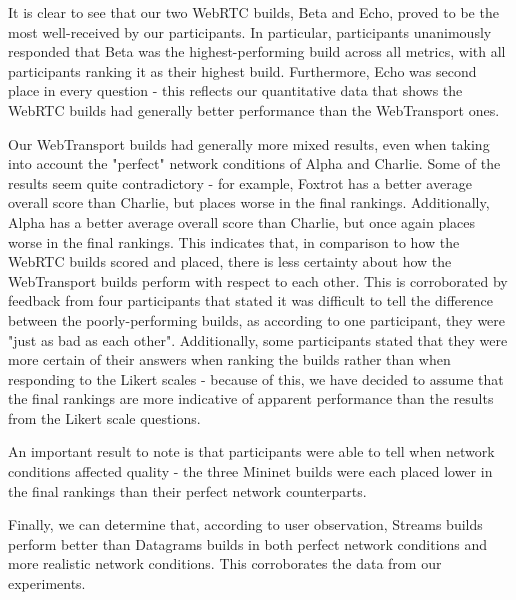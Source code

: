 It is clear to see that our two WebRTC builds, Beta and Echo, proved to be the most well-received by our participants. In particular, participants unanimously responded that Beta was the highest-performing build across all metrics, with all participants ranking it as their highest build. Furthermore, Echo was second place in every question - this reflects our quantitative data that shows the WebRTC builds had generally better performance than the WebTransport ones.  

Our WebTransport builds had generally more mixed results, even when taking into account the "perfect" network conditions of Alpha and Charlie. Some of the results seem quite contradictory - for example, Foxtrot has a better average overall score than Charlie, but places worse in the final rankings. Additionally, Alpha has a better average overall score than Charlie, but once again places worse in the final rankings. This indicates that, in comparison to how the WebRTC builds scored and placed, there is less certainty about how the WebTransport builds perform with respect to each other. This is corroborated by feedback from four participants that stated it was difficult to tell the difference between the poorly-performing builds, as according to one participant, they were "just as bad as each other". Additionally, some participants stated that they were more certain of their answers when ranking the builds rather than when responding to the Likert scales - because of this, we have decided to assume that the final rankings are more indicative of apparent performance than the results from the Likert scale questions.

An important result to note is that participants were able to tell when network conditions affected quality - the three Mininet builds were each placed lower in the final rankings than their perfect network counterparts.

Finally, we can determine that, according to user observation, Streams builds perform better than Datagrams builds in both perfect network conditions and more realistic network conditions. This corroborates the data from our experiments.

